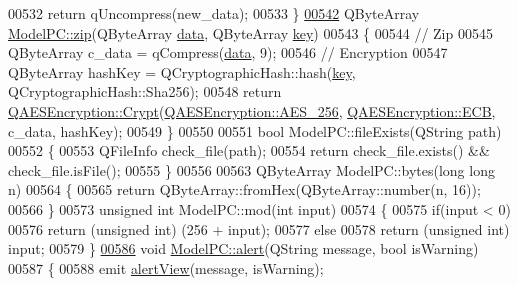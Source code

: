 \begin{DoxyCode}
00532     \textcolor{keywordflow}{return} qUncompress(new\_data);
00533 \}
\mbox{\hyperlink{class_model_p_c_afebbbfa4b07deba4f68fc6dfb50f353f}{00542}} QByteArray \mbox{\hyperlink{class_model_p_c_afebbbfa4b07deba4f68fc6dfb50f353f}{ModelPC::zip}}(QByteArray \mbox{\hyperlink{namespace_errors_dict_setup_af570460846fb9f0c91abd308a095dcdc}{data}}, QByteArray \mbox{\hyperlink{namespace_errors_dict_setup_a09c268098d09ffb8e5504f30fa6d5dd9}{key}})
00543 \{
00544     \textcolor{comment}{// Zip}
00545     QByteArray c\_data = qCompress(\mbox{\hyperlink{namespace_errors_dict_setup_af570460846fb9f0c91abd308a095dcdc}{data}}, 9);
00546     \textcolor{comment}{// Encryption}
00547     QByteArray hashKey = QCryptographicHash::hash(\mbox{\hyperlink{namespace_errors_dict_setup_a09c268098d09ffb8e5504f30fa6d5dd9}{key}}, QCryptographicHash::Sha256);
00548     \textcolor{keywordflow}{return} \mbox{\hyperlink{class_q_a_e_s_encryption_a43819eeb6a7cb29fbd3cb6ad640dcbdf}{QAESEncryption::Crypt}}(\mbox{\hyperlink{class_q_a_e_s_encryption_abe48208f4f6c7d68e6a10b49b9d0b7bdacde97774ab1d4c609e04b0dd13a1e1f7}{QAESEncryption::AES\_256}}, 
      \mbox{\hyperlink{class_q_a_e_s_encryption_ad3e031c49a3d56566379d75b40b7b255a4ca7f51778e2adf1f464164a0ba8e75e}{QAESEncryption::ECB}}, c\_data, hashKey);
00549 \}
00550 
00551 \textcolor{keywordtype}{bool} ModelPC::fileExists(QString path)
00552 \{
00553     QFileInfo check\_file(path);
00554     \textcolor{keywordflow}{return} check\_file.exists() && check\_file.isFile();
00555 \}
00556 
00563 QByteArray ModelPC::bytes(\textcolor{keywordtype}{long} \textcolor{keywordtype}{long} n)
00564 \{
00565     \textcolor{keywordflow}{return} QByteArray::fromHex(QByteArray::number(n, 16));
00566 \}
00573 \textcolor{keywordtype}{unsigned} \textcolor{keywordtype}{int} ModelPC::mod(\textcolor{keywordtype}{int} input)
00574 \{
00575     \textcolor{keywordflow}{if}(input < 0)
00576         \textcolor{keywordflow}{return} (\textcolor{keywordtype}{unsigned} \textcolor{keywordtype}{int}) (256 + input);
00577     \textcolor{keywordflow}{else}
00578         \textcolor{keywordflow}{return} (\textcolor{keywordtype}{unsigned} \textcolor{keywordtype}{int}) input;
00579 \}
\mbox{\hyperlink{class_model_p_c_a9079a101d83672aa48fd2dbac797de40}{00586}} \textcolor{keywordtype}{void} \mbox{\hyperlink{class_model_p_c_a9079a101d83672aa48fd2dbac797de40}{ModelPC::alert}}(QString message, \textcolor{keywordtype}{bool} isWarning)
00587 \{
00588     emit \mbox{\hyperlink{class_model_p_c_aef1f058227af54e4cfc9fc4c4397d30c}{alertView}}(message, isWarning);

\end{DoxyCode}
